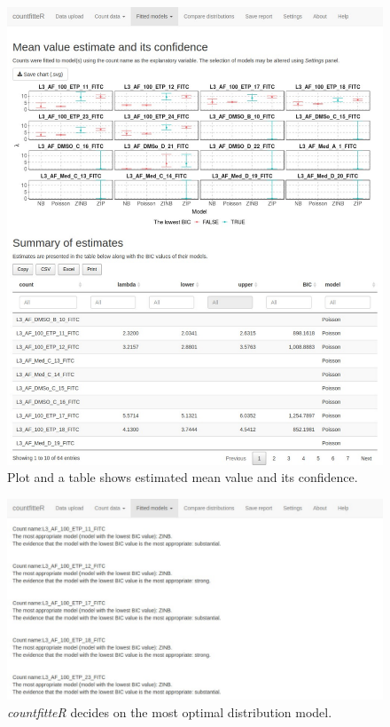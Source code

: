 \begin{figure}[htbp]
  \centering
  \includegraphics[width=0.99\columnwidth]{fig/cf_fm1.pdf}
  \caption{Plot and a table shows estimated mean value and its confidence.}
    \label{cf_fm1}
\end{figure}


\begin{figure}[htbp]
  \centering
  \includegraphics[width=0.99\columnwidth]{fig/cf_fm3.pdf}
  \caption{\emph{countfitteR} decides on the most optimal distribution model.}
    \label{cf_fm3}
\end{figure}

